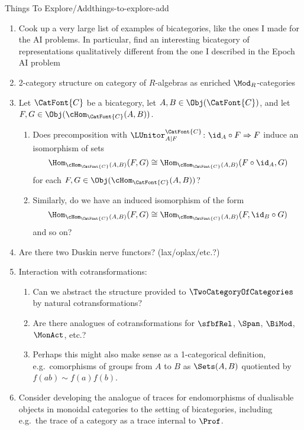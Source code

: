 \begin{remark}{Things To Explore/Add}{things-to-explore-add}
\begin{enumerate}
        \item Cook up a very large list of examples of bicategories, like the ones I made for the AI problems. In particular, find an interesting bicategory of representations qualitatively different from the one I described in the Epoch AI problem
        \item 2-category structure on category of $R$-algebras as enriched $\Mod_{R}$-categories
        \item Let $\CatFont{C}$ be a bicategory, let $A,B\in\Obj(\CatFont{C})$, and let $F,G\in\Obj(\cHom_{\CatFont{C}}(A,B))$.
            \begin{enumerate}
                \item Does precomposition with $\LUnitor^{\CatFont{C}}_{A|F}\colon\id_{A}\circ F\Rightarrow F$ induce an isomorphism of sets
                    \[
                        \Hom_{\cHom_{\CatFont{C}}(A,B)}(F,G)%
                        \cong%
                        \Hom_{\cHom_{\CatFont{C}}(A,B)}(F\circ\id_{A},G)%
                    \]%
                    for each $F,G\in\Obj(\cHom_{\CatFont{C}}(A,B))$?
                \item Similarly, do we have an induced isomorphism of the form
                    \[
                        \Hom_{\cHom_{\CatFont{C}}(A,B)}(F,G)%
                        \cong%
                        \Hom_{\cHom_{\CatFont{C}}(A,B)}(F,\id_{B}\circ G)%
                    \]%
                    and so on?
            \end{enumerate}
        \item Are there two Duskin nerve functors? (lax/oplax/etc.?)
        \item Interaction with cotransformations:
            \begin{enumerate}
                \item Can we abstract the structure provided to $\TwoCategoryOfCategories$ by natural cotransformations?
                \item Are there analogues of cotransformations for $\sfbfRel$, $\Span$, $\BiMod$, $\MonAct$, etc.?
                \item Perhaps this might also make sense as a 1-categorical definition, e.g.\ comorphisms of groups from $A$ to $B$ as $\Sets(A,B)$ quotiented by $f(ab)\sim f(a)f(b)$.
            \end{enumerate}
        \item Consider developing the analogue of traces for endomorphisms of dualisable objects in monoidal categories to the setting of bicategories, including e.g.\ the trace of a category as a trace internal to $\Prof$.

\end{enumerate}
\end{remark}
